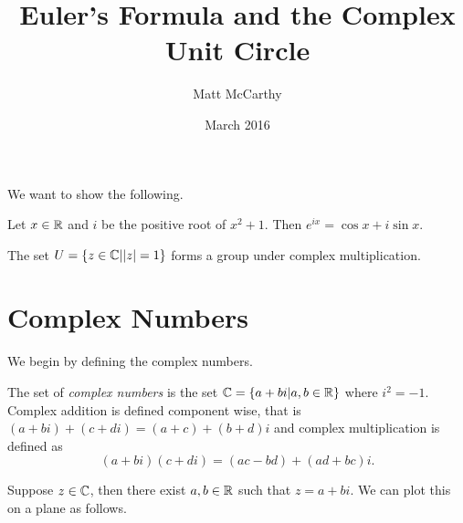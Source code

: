 \documentclass[notitlepage]{simple}
\author{Matt McCarthy}
\title{Euler's Formula and the Complex Unit Circle}
\date{March 2016}
\begin{document}
\maketitle

We want to show the following.

\begin{thm*}
	Let $x\in\mathbb{R}$ and $i$ be the positive root of $x^2+1$.
	Then $e^{ix} = \cos x + i \sin x$.
\end{thm*}

\begin{thm*}
	The set $U = \lbrace z\in\mathbb{C} | |z|=1 \rbrace$ forms a group under complex multiplication.
\end{thm*}

\section{Complex Numbers}

We begin by defining the complex numbers.

\begin{definition}
	The set of \textit{complex numbers} is the set $\mathbb{C}=\lbrace a+bi|a,b\in\mathbb{R} \rbrace$ where $i^2=-1$.
	Complex addition is defined component wise, that is $(a+bi)+(c+di)=(a+c)+(b+d)i$ and complex multiplication is defined as
	\[
		(a+bi)(c+di) = (ac -bd) + (ad + bc)i.
	\]
\end{definition}

Suppose $z\in\mathbb{C}$, then there exist $a,b\in\mathbb{R}$ such that $z=a+bi$.
We can plot this on a plane as follows.
\end{document}
